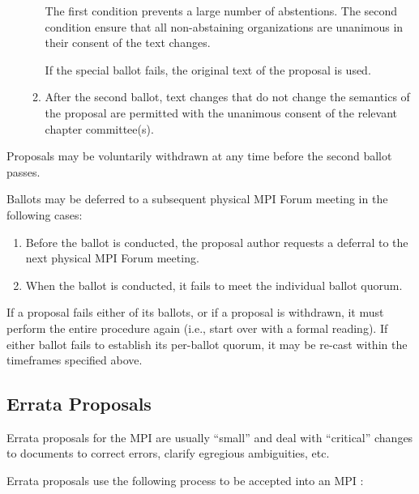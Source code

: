 \begin{enumerate}
\begin{enumerate}
    \begin{rationale}
      The first condition prevents a large number of abstentions.
      The second condition ensure that all non-abstaining
      organizations are unanimous in their consent of the text
      changes.
    \end{rationale}
    
    If the special ballot fails, the original text of the proposal
    is used.

  \item After the second ballot, text changes that do not change the
    semantics of the proposal are permitted with the unanimous consent
    of the relevant chapter committee(s).
  \end{enumerate}
\end{enumerate}

Proposals may be voluntarily withdrawn at any time before the second
ballot passes.

Ballots may be deferred to a subsequent physical MPI Forum meeting in
the following cases:

\begin{enumerate}
\item Before the ballot is conducted, the proposal author requests a
  deferral to the next physical MPI Forum meeting.
\item When the ballot is conducted, it fails to meet the individual
  ballot quorum.
\end{enumerate}

If a proposal fails either of its ballots, or if a proposal is
withdrawn, it must perform the entire procedure again (i.e., start
over with a formal reading).  If either ballot fails to establish its
per-ballot quorum, it may be re-cast within the timeframes specified
above.


\subsection{Errata Proposals}

Errata proposals for the MPI {\color{red}{Standard Documents}} are usually ``small''
and deal with ``critical'' changes to documents to correct errors,
clarify egregious ambiguities, etc.

Errata proposals use the following process to be accepted into an MPI
{\color{red}{Standard Document}}:

